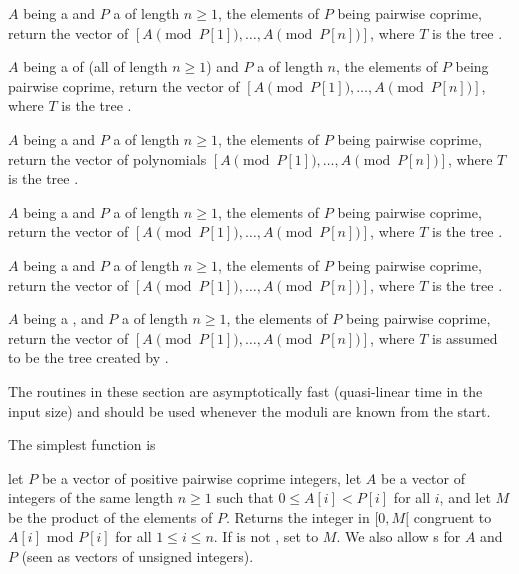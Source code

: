  $A$ being a 
and $P$ a  of length $n\ge 1$, the elements of $P$ being
pairwise coprime, return the vector of 
$[A \pmod{P[1]},\ldots,A \pmod{P[n]}]$,
where $T$ is the tree .

 $A$ being a 
of  (all of length $n\ge 1$) and $P$ a  of length $n$,
the elements of $P$ being pairwise coprime, return the vector of 
$[A \pmod{P[1]},\ldots,A \pmod{P[n]}]$,
where $T$ is the tree .

 $A$ being a 
and $P$ a  of length $n\ge 1$, the elements of $P$ being
pairwise coprime, return the vector of  polynomials
$[A \pmod{P[1]},\ldots,A \pmod{P[n]}]$,
where $T$ is the tree .

 $A$ being a 
and $P$ a  of length $n\ge 1$, the elements of $P$ being
pairwise coprime, return the vector of 
$[A \pmod{P[1]},\ldots,A \pmod{P[n]}]$,
where $T$ is the tree .

 $A$ being a 
and $P$ a  of length $n\ge 1$, the elements of $P$ being
pairwise coprime, return the vector of 
$[A \pmod{P[1]},\ldots,A \pmod{P[n]}]$,
where $T$ is the tree .

 $A$ being a ,
and $P$ a  of length $n\ge 1$, the elements of $P$ being
pairwise coprime, return the vector of 
$[A \pmod{P[1]},\ldots,A \pmod{P[n]}]$,
where $T$ is assumed to be the tree created by .

\medskip

The routines in these section are asymptotically fast (quasi-linear time in
the input size) and should be used whenever the moduli are known from
the start.

The simplest function is

let $P$ be a vector of positive pairwise coprime integers, let $A$ be a
vector of integers of the same length $n\ge 1$ such that $0 \leq A[i] < P[i]$
for all $i$, and let $M$ be the product of the elements of $P$. Returns the
integer in $[0, M[$ congruent to $A[i]$ mod $P[i]$ for all $1\leq i\leq n$.
If  is not , set  to $M$. We also allow
s for $A$ and $P$ (seen as vectors of unsigned integers).

